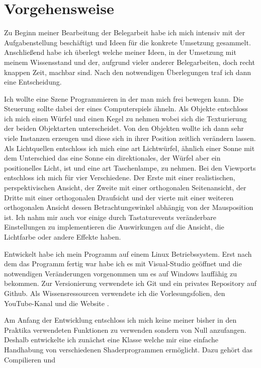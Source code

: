 \documentclass{article}
\begin{document}
\section{Vorgehensweise}\label{Vorgehensweise}
Zu Beginn meiner Bearbeitung der Belegarbeit habe ich mich intensiv mit der Aufgabenstellung beschäftigt und Ideen
für die konkrete Umsetzung gesammelt. Anschließend habe ich überlegt welche meiner Ideen, in der Umsetzung mit meinem
Wissensstand und der, aufgrund vieler anderer Belegarbeiten, doch recht knappen Zeit, machbar sind.
Nach den notwendigen Überlegungen traf ich dann eine Entscheidung.\par
\medskip
Ich wollte eine Szene Programmieren in der man mich frei bewegen kann. Die Steuerung sollte dabei der eines
Computerspiels ähneln. Als Objekte entschloss ich mich einen Würfel und einen Kegel zu nehmen wobei sich die
Texturierung der beiden Objektarten unterscheidet. Von den Objekten wollte ich dann sehr viele Instanzen erzeugen und diese
sich in ihrer Position zeitlich verändern lassen. Als Lichtquellen entschloss ich mich eine art Lichtwürfel, ähnlich einer
Sonne mit dem Unterschied das eine Sonne ein direktionales, der Würfel aber ein positionelles Licht, ist und eine
art Taschenlampe, zu nehmen. Bei den Viewports entschloss ich mich für vier Verschiedene. Der Erste mit einer realistischen, 
perspektivischen Ansicht, der Zweite mit einer orthogonalen Seitenansicht, der Dritte mit einer orthogonalen
Draufsicht und der vierte mit einer weiteren orthogonalen Ansicht dessen Betrachtungswinkel abhängig von der Mausposition ist.
Ich nahm mir auch vor einige durch Tastaturevents veränderbare Einstellungen zu implementieren die Auswirkungen auf die
Ansicht, die Lichtfarbe oder andere Effekte haben.\par
\medskip
Entwickelt habe ich mein Programm auf einem Linux Betriebssystem. Erst nach dem das Programm fertig war habe ich es
mit Visual-Studio geöffnet und die notwendigen Veränderungen vorgenommen um es auf Windows lauffähig zu bekommen.
Zur Versionierung verwendete ich Git und ein privates Repository auf Github. Als Wissensressourcen verwendete ich
die Vorlesungsfolien, den YouTube-Kanal  \cite{BrianWill} und die Website 
\cite{learnopengl}.\par
\medskip
Am Anfang der Entwicklung entschloss ich mich keine meiner bisher in den Praktika verwendeten Funktionen zu verwenden
sondern von Null anzufangen. Deshalb entwickelte ich zunächst eine Klasse  welche mir eine einfache
Handhabung von verschiedenen Shaderprogrammen ermöglicht. Dazu gehört das Compilieren und
\end{document}
